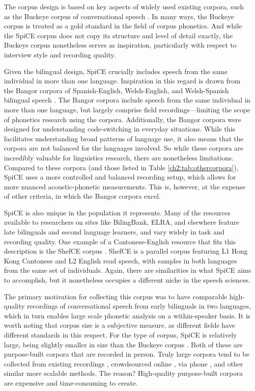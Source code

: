 The corpus design is based on key aspects of widely used existing corpora, such as the Buckeye corpus of conversational speech \citep{pitt_2005_buckeye}. In many ways, the Buckeye corpus is treated as a gold standard in the field of corpus phonetics. And while the SpiCE corpus does not copy its structure and level of detail exactly, the Buckeye corpus nonetheless serves as inspiration, particularly with respect to interview style and recording quality.

Given the bilingual design, SpiCE crucially includes speech from the same individual in more than one language. Inspiration in this regard is drawn from the Bangor corpora of Spanish-English, Welsh-English, and Welsh-Spanish bilingual speech \citep{deuchar_2014_corpora}. The Bangor corpora include speech from the same individual in more than one language, but largely comprise field recordings---limiting the scope of phonetics research using the corpora. Additionally, the Bangor corpora were designed for understanding code-switching in everyday situations. While this facilitates understanding broad patterns of language use, it also means that the corpora are not balanced for the languages involved. So while these corpora are incredibly valuable for linguistics research, there are nonetheless limitations. Compared to these corpora (and those listed in Table \ref{ch2:tab:othercorpora}), SpiCE uses a more controlled and balanced recording setup, which allows for more nuanced acoustic-phonetic measurements. This is, however, at the expense of other criteria, in which the Bangor corpora excel. 

SpiCE is also unique in the population it represents. Many of the resources available to researchers on sites like BilingBank, ELRA, and elsewhere feature late bilinguals and second language learners, and vary widely in task and recording quality. One example of a Cantonese-English resource that fits this description is the ShefCE corpus \citep{ng_shefce_2017}. ShefCE is a parallel corpus featuring L1 Hong Kong Cantonese and L2 English read speech, with samples in both languages from the same set of individuals. Again, there are similarities in what SpiCE aims to accomplish, but it nonetheless occupies a different niche in the speech sciences.

The primary motivation for collecting this corpus was to have comparable high-quality recordings of conversational speech from early bilinguals in two languages, which in turn enables large scale phonetic analysis on a within-speaker basis. It is worth noting that corpus size is a subjective measure, as different fields have different standards in this respect. For the type of corpus, SpiCE is relatively large, being slightly smaller in size than the Buckeye corpus \citep{pitt_2005_buckeye}. Both of these are purpose-built corpora that are recorded in person. Truly large corpora tend to be collected from existing recordings \citep[radio, YouTube, audiobooks, etc.; e.g., Librispeech:][]{panayotov_librispeech_2015}, crowdsourced online \citep[e.g. Mozilla Common Voice:][]{ardila_common_2020}, via phone \citep[e.g., SWITCHBOARD:][]{godfrey_switchboard_1992}, and other similar more scalable methods. The reason? High-quality purpose-built corpora are expensive and time-consuming to create. 

